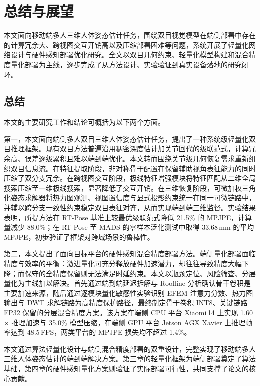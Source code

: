 \newpage
\section{总结与展望}

本文面向移动端多人三维人体姿态估计任务，围绕双目视觉模型在端侧部署中存在的计算冗余大、跨视图交互开销高以及压缩部署困难等问题，系统开展了轻量化网络设计与硬件感知部署优化研究。全文以双目几何约束、轻量化模型构建和混合精度量化部署为主线，逐步完成了从方法设计、实验验证到真实设备落地的研究闭环。

\subsection{总结}

本文的主要研究工作和结论可概括为以下两个方面。

第一，本文面向端侧多人双目三维人体姿态估计任务，提出了一种系统级轻量化双目推理框架。现有双目方法普遍沿用稠密深度估计加关节回代的级联范式，计算冗余高、误差逐级累积且难以端到端优化。本文转而围绕关节级几何恢复需求重新组织双目信息流。在特征提取阶段，非对称骨干配置在保留辅助视角表征能力的同时压缩了双分支冗余。在跨视图交互阶段，极线特征增强模块将特征匹配从二维全局搜索压缩至一维极线搜索，显著降低了交互开销。在三维恢复阶段，可微加权三角化姿态求解器将热力图观测、视图置信度与显式投影约束统一在同一可微链路中，并辅以跨分支一致性约束稳定双目表征对齐，从而实现端到端三维监督。实验结果表明，所提方法在 RT-Pose 基准上较最优级联范式降低 21.5\% 的 MPJPE，计算量减少 88.0\%；在 RT-Pose 至 MADS 的零样本泛化测试中取得 33.68\,mm 的平均 MPJPE，初步验证了框架对跨域场景的鲁棒性。

第二，本文提出了面向目标平台的硬件感知混合精度部署方法。端侧量化部署面临精度与效率的平衡：激进量化可充分释放硬件加速潜力，却往往导致精度大幅下降；而保守的全精度保留则无法满足时延约束。本文以瓶颈定位、风险筛查、分层量化为主线加以解决。首先通过端到端延迟拆解与 Roofline 分析确认骨干卷积是主要加速来源，随后通过逐模块量化敏感性实验识别 EFEM 注意力分数、热力图输出与 DWT 求解链路为高精度保护路径，最终制定骨干卷积 INT8、关键链路 FP32 保留的分层混合精度方案。该方案在端侧 CPU 平台 Xiaomi\,14 上实现 1.60$\times$ 推理加速与 35.0\% 模型压缩，在端侧 GPU 平台 Jetson AGX Xavier 上推理帧率达到 48.5\,FPS，两类平台的 MPJPE 损失均不超过 1.4\%。

本文通过算法轻量化设计与端侧混合精度部署的双重设计，完整实现了移动端多人三维人体姿态估计的端到端解决方案。第三章的轻量化框架为端侧部署奠定了算法基础，第四章的硬件感知量化方案则验证了实际部署可行性，共同支撑了论文的核心贡献。

